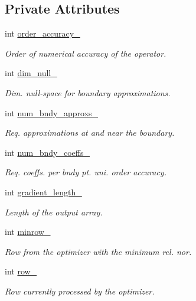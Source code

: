 \subsection*{Private Attributes}
\begin{DoxyCompactItemize}
\item 
int \hyperlink{classmtk_1_1Grad1D_a545e9c865e5d4716f2684a64f744c78c}{order\+\_\+accuracy\+\_\+}
\begin{DoxyCompactList}\small\item\em Order of numerical accuracy of the operator. \end{DoxyCompactList}\item 
int \hyperlink{classmtk_1_1Grad1D_abe8eaf4f5c451f82c062daaef31e9e6a}{dim\+\_\+null\+\_\+}
\begin{DoxyCompactList}\small\item\em Dim. null-\/space for boundary approximations. \end{DoxyCompactList}\item 
int \hyperlink{classmtk_1_1Grad1D_abe15c1ffd9dfaba1a65f4f0e096287ce}{num\+\_\+bndy\+\_\+approxs\+\_\+}
\begin{DoxyCompactList}\small\item\em Req. approximations at and near the boundary. \end{DoxyCompactList}\item 
int \hyperlink{classmtk_1_1Grad1D_a60c560882bc601f9ab1d4cd5331e55ef}{num\+\_\+bndy\+\_\+coeffs\+\_\+}
\begin{DoxyCompactList}\small\item\em Req. coeffs. per bndy pt. uni. order accuracy. \end{DoxyCompactList}\item 
int \hyperlink{classmtk_1_1Grad1D_a98a444d0833fec92fb9908e3ea71a511}{gradient\+\_\+length\+\_\+}
\begin{DoxyCompactList}\small\item\em Length of the output array. \end{DoxyCompactList}\item 
int \hyperlink{classmtk_1_1Grad1D_a27b8a20e163ad803546592cc3736c12a}{minrow\+\_\+}
\begin{DoxyCompactList}\small\item\em Row from the optimizer with the minimum rel. nor. \end{DoxyCompactList}\item 
int \hyperlink{classmtk_1_1Grad1D_a7947235d61d0dd27c5b81a81ca78d9a8}{row\+\_\+}
\begin{DoxyCompactList}\small\item\em Row currently processed by the optimizer. \end{DoxyCompactList}\item 

\end{DoxyCompactItemize}
